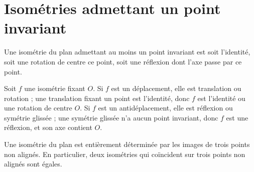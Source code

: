 \section{Isométries admettant un point invariant}

\begin{theoreme}
Une isométrie du plan admettant au moins un point invariant est soit
l'identité, soit une rotation de centre ce point, soit une réflexion dont
l'axe passe par ce point.
\end{theoreme}

\begin{demonstration}
Soit $f$ une isométrie fixant $O$. Si $f$ est un déplacement, elle est
translation ou rotation ; une translation fixant un point est l'identité, donc
$f$ est l'identité ou une rotation de centre $O$. Si $f$ est un
antidéplacement, elle est réflexion ou symétrie glissée ; une symétrie glissée
n'a aucun point invariant, donc $f$ est une réflexion, et son axe contient
$O$.
\end{demonstration}

\begin{propriete}
Une isométrie du plan est entièrement déterminée par les images de trois
points non alignés. En particulier, deux isométries qui coïncident sur trois
points non alignés sont égales.
\end{propriete}


